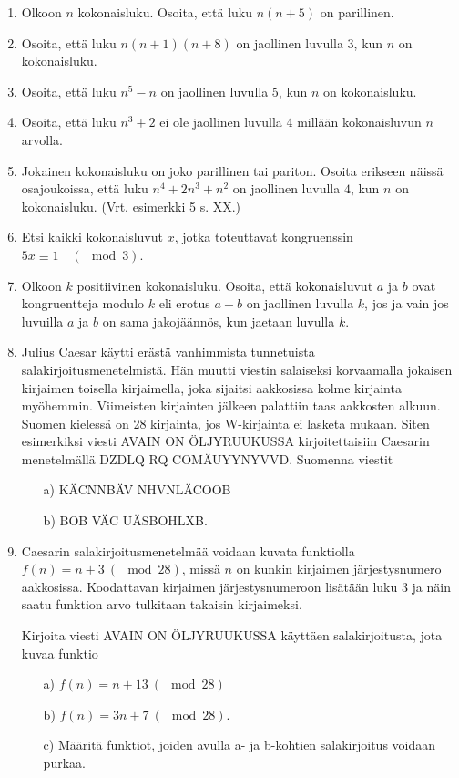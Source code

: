 \begin{enumerate}
\item Olkoon $n$ kokonaisluku. Osoita, että luku $n(n + 5)$ on parillinen.

\item Osoita, että luku $n(n + 1)(n + 8)$ on jaollinen luvulla 3, kun $n$ on kokonaisluku.

\item Osoita, että luku $n^5 - n$ on jaollinen luvulla 5, kun $n$ on kokonaisluku.

\item Osoita, että luku $n^3 + 2$ ei ole jaollinen luvulla 4 millään kokonaisluvun $n$ arvolla.

\item Jokainen kokonaisluku on joko parillinen tai pariton. Osoita erikseen näissä osajoukoissa, että luku $n^4 + 2n^3 + n^2$ on jaollinen luvulla $4$, kun $n$ on kokonaisluku. (Vrt. esimerkki 5 s. XX.)

\item
Etsi kaikki kokonaisluvut $x$, jotka toteuttavat kongruenssin $5x\equiv 1 \quad (\mod 3)$.

\item
Olkoon $k$ positiivinen kokonaisluku. Osoita, että kokonaisluvut $a$ ja $b$ ovat kongruentteja modulo $k$ eli erotus $a-b$ on jaollinen luvulla $k$, jos ja vain jos luvuilla $a$ ja $b$ on sama jakojäännös, kun jaetaan luvulla $k$.

\item Julius Caesar käytti erästä vanhimmista tunnetuista salakirjoitusmenetelmistä. Hän muutti viestin salaiseksi korvaamalla jokaisen kirjaimen toisella kirjaimella, joka sijaitsi aakkosissa kolme kirjainta myöhemmin. Viimeisten kirjainten jälkeen palattiin taas aakkosten alkuun. Suomen kielessä on 28 kirjainta, jos W-kirjainta ei lasketa mukaan. Siten esimerkiksi viesti AVAIN ON ÖLJYRUUKUSSA kirjoitettaisiin Caesarin menetelmällä DZDLQ RQ COMÄUYYNYVVD. Suomenna viestit 
\begin{itemize}
\item[a)] KÄCNNBÄV NHVNLÄCOOB
\item[b)] BOB VÄC UÄSBOHLXB.
\end{itemize}

\item Caesarin salakirjoitusmenetelmää voidaan kuvata funktiolla $f(n) = n + 3 \ (\mod 28)$, missä $n$ on kunkin kirjaimen järjestysnumero aakkosissa. Koodattavan kirjaimen järjestysnumeroon lisätään luku $3$ ja näin saatu funktion arvo tulkitaan takaisin kirjaimeksi. 

Kirjoita viesti AVAIN ON ÖLJYRUUKUSSA käyttäen salakirjoitusta, jota kuvaa funktio 
\begin{itemize}
\item[a)] $f(n) = n + 13 \ (\mod 28)$
\item[b)] $f(n) = 3n + 7 \ (\mod 28)$.
\item[c)] Määritä funktiot, joiden avulla a- ja b-kohtien salakirjoitus voidaan purkaa.
\end{itemize}

\end{enumerate}

